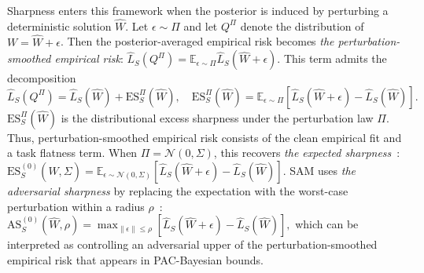 \documentclass{article}
\begin{document}
Sharpness enters this framework when the posterior is induced by perturbing a deterministic solution $\widehat W$.
Let $\epsilon\sim\Pi$ and let $Q^\Pi$ denote the distribution of $W=\widehat W+\epsilon$.
Then the posterior-averaged empirical risk becomes \emph{the perturbation-smoothed empirical risk}:
$
\widehat L_S(Q^\Pi)
=
\mathbb E_{\epsilon\sim\Pi}
\widehat L_S(\widehat W+\epsilon).
$
This term admits the decomposition
$$
    \widehat L_S(Q^\Pi)
=
\widehat L_S(\widehat W)
+
\mathrm{ES}^{\Pi}_S(\widehat W), \quad
\mathrm{ES}^{\Pi}_S(\widehat W)
=
\mathbb E_{\epsilon\sim\Pi}
[
\widehat L_S(\widehat W+\epsilon)
-
\widehat L_S(\widehat W)
].
$$
$\mathrm{ES}^{\Pi}_S(\widehat W)$ is the distributional excess sharpness under the perturbation law $\Pi$.
Thus, perturbation-smoothed empirical risk consists of the clean empirical fit and a task flatness term.
When $\Pi=\mathcal N(0,\Sigma)$, this recovers \emph{the expected sharpness}~\citep{liRevisitingRandomWeight2024,jiang2019fantasticgeneralizationmeasures}:
$
\mathrm{ES}^{(0)}_S(\widehat W,\Sigma)
=
\mathbb E_{\epsilon\sim\mathcal N(0,\Sigma)}
[
\widehat L_S(\widehat W+\epsilon)
-
\widehat L_S(\widehat W)
].
$
SAM uses \emph{the adversarial sharpness} by replacing the expectation with the worst-case perturbation within a radius $\rho$~\citep{foretSharpnessAwareMinimizationEfficiently2021}:
$
\mathrm{AS}^{(0)}_S(\widehat W,\rho)
=
\max_{\|\epsilon\|\le\rho}
[
\widehat L_S(\widehat W+\epsilon)
-
\widehat L_S(\widehat W)
],
$
which can be interpreted as controlling an adversarial upper of the perturbation-smoothed empirical risk that appears in PAC-Bayesian bounds\cite{mollenhoffSAMOptimalRelaxation2022}.

\end{document}
